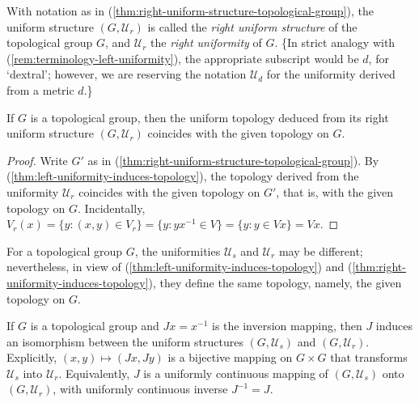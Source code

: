 \begin{definition}
    With notation as in (\ref{thm:right-uniform-structure-topological-group}), the uniform structure \( (G, \mathcal{U}_r) \) is called the \textit{right uniform structure} of the topological group \( G \),
    and \( \mathcal{U}_r \) the \textit{right uniformity} of \( G \).
    \{In strict analogy with (\ref{rem:terminology-left-uniformity}), the appropriate subscript would be \( d \), for ‘dextral’; however, we are reserving the notation \( \mathcal{U}_d \)
    for the uniformity derived from a metric \( d \).\}
\end{definition}

\begin{theorem}
    \label{thm:right-uniformity-induces-topology}

    If \( G \) is a topological group, then the uniform topology deduced from its right uniform structure \( (G, \mathcal{U}_r) \) coincides with the given topology on \( G \).
\end{theorem}

\begin{proof}
    Write \( G' \) as in (\ref{thm:right-uniform-structure-topological-group}).
    By (\ref{thm:left-uniformity-induces-topology}), the topology derived from the uniformity \( \mathcal{U}_r \) coincides with the given topology on \( G' \),
    that is, with the given topology on \( G \).
    Incidentally, \( V_r(x) = \{ y : (x, y) \in V_r \} = \{ y : yx^{-1} \in V \} = \{ y : y \in Vx \} = Vx. \)
\end{proof}

\begin{theorem}
    For a topological group \( G \), the uniformities \( \mathcal{U}_s \) and \( \mathcal{U}_r \) may be different; nevertheless, in view of (\ref{thm:left-uniformity-induces-topology}) and (\ref{thm:right-uniformity-induces-topology}),
    they define the same topology, namely, the given topology on \( G \).
\end{theorem}

\begin{theorem}
    If \( G \) is a topological group and \( Jx = x^{-1} \) is the inversion mapping,
    then \( J \) induces an isomorphism between the uniform structures \( (G, \mathcal{U}_s) \) and \( (G, \mathcal{U}_r) \).
    Explicitly, \( (x, y) \mapsto (Jx, Jy) \) is a bijective mapping on \( G \times G \) that transforms \( \mathcal{U}_s \) into \( \mathcal{U}_r \).
    Equivalently, \( J \) is a uniformly continuous mapping of \( (G, \mathcal{U}_s) \) onto \( (G, \mathcal{U}_r) \), with uniformly continuous inverse \( J^{-1} = J \).
\end{theorem}

